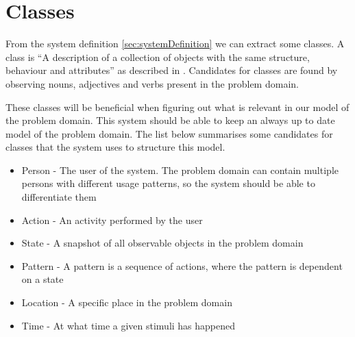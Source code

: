 \section{Classes}\label{sec:classes}
From the system definition \cref{sec:systemDefinition} we can extract some classes. A class is \enquote{A description of a collection of objects with the same structure, behaviour and attributes} as described in \cite{OOAD}. Candidates for classes are found by observing nouns, adjectives and verbs present in the problem domain.

These classes will be beneficial when figuring out what is relevant in our model of the problem domain. This system should be able to keep an always up to date model of the problem domain. The list below summarises some candidates for classes that the system uses to structure this model.

\begin{itemize}
\item Person - The user of the system. The problem domain can contain multiple persons with different usage patterns, so the system should be able to differentiate them
\item Action - An activity performed by the user
\item State - A snapshot of all observable objects in the problem domain
\item Pattern - A pattern is a sequence of actions, where the pattern is dependent on a state
\item Location - A specific place in the problem domain
\item Time - At what time a given stimuli has happened
\end{itemize}
